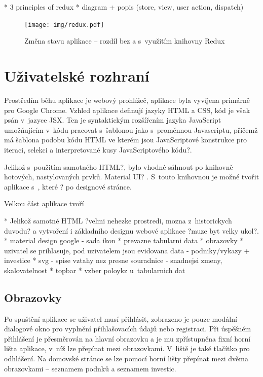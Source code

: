 * 3 principles of redux
* diagram + popis (store, view, user action, dispatch)

\begin{figure}
  \centering
  \texttt{[image: img/redux.pdf]}
  \caption{Změna stavu aplikace -- rozdíl bez a s~využitím knihovny Redux \cite{redux}}
\end{figure}



\section{Uživatelské rozhraní}

Prostředím běhu aplikace je webový prohlížeč, aplikace byla vyvíjena primárně pro Google Chrome. Vzhled aplikace definují jazyky HTML a CSS, kód je však psán v~jazyce JSX. Ten je syntaktickým rozšířením jazyka JavaScript umožňujícím v~kódu pracovat s~šablonou jako s~proměnnou Javascriptu, přičemž má šablona podobu kódu HTML ve kterém jsou JavaScriptové konstrukce pro iteraci, selekci a interpretované kusy JavaScriptového kódu?.

Jelikož s~použitím samotného HTML?, bylo vhodné sáhnout po knihovně hotových, nastylovaných prvků. Material UI? . S~touto knihovnou je možné tvořit aplikace s~, které ? po designové stránce.

Velkou část aplikace tvoří

* Jelikož samotné HTML ?velmi nehezke prostredi, mozna z~historickych duvodu? a vytvoření i základního designu webové aplikace ?muze byt velky ukol?. 
* material design google - sada ikon
* prevazne tabularni data
* obrazovky
* uzivatel se prihlasuje, pod uzivatelem jsou evidovana data - podniky/vykazy + investice
* svg - spise vztahy nez presne souradnice - snadnejsi zmeny, skalovatelnost
* topbar
* vzber poloykz u~tabularnich dat

\subsection{Obrazovky}

Po spuštění aplikace se uživatel musí přihlásit, zobrazeno je pouze modální dialogové okno pro vyplnění přihlašovacích údajů nebo registraci. Při úspěšném přihlášení je přesměrován na hlavní obrazovku a je mu zpřístupněna fixní horní lišta aplikace, v~níž lze přepínat mezi obrazovkami. V~liště je také tlačítko pro odhlášení. Na domovské stránce se lze pomocí horní lišty přepínat mezi dvěma obrazovkami -- seznamem podnků a seznamem investic.

